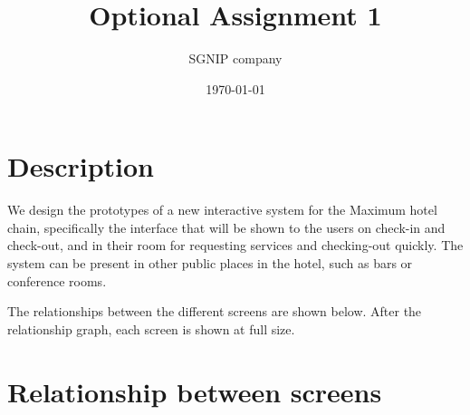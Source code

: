 \documentclass{article}
\title{Optional Assignment 1}
\date{\today}
\author{SGNIP company}
\begin{document}
\maketitle

\section{Description}

We design the prototypes of a new interactive system for the Maximum hotel chain, specifically the interface that will be shown to the users on check-in and check-out, and in their room for requesting services and checking-out quickly. The system can be present in other public places in the hotel, such as bars or conference rooms.

The relationships between the different screens are shown below. After the relationship graph, each screen is shown at full size.

\newpage
\section{Relationship between screens}
\end{document}
